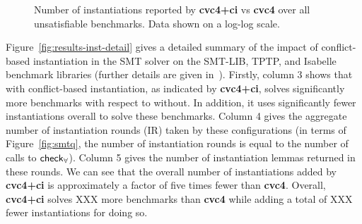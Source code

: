 \documentclass[oribibl]{llncs}
\begin{document}
\begin{figure}[t]
\caption{ Number of instantiations reported by
{\bf cvc4+ci} vs {\bf cvc4} over all unsatisfiable benchmarks.
Data shown on a log-log scale.
}
\label{fig:cbqi-scatter}
\end{figure}

Figure~\ref{fig:results-inst-detail}
gives a detailed summary of the impact of conflict-based instantiation in the SMT solver \cvc
on the SMT-LIB, TPTP, and Isabelle benchmark libraries (further details are given in~\cite{}).
Firstly, column 3 shows that \cvc with conflict-based instantiation, as indicated by {\bf cvc4+ci},
solves significantly more benchmarks with respect to \cvc without.
In addition, it uses significantly fewer instantiations overall to solve these benchmarks.
Column 4 gives the aggregate number of instantiation rounds (IR) taken by these configurations
(in terms of Figure~\ref{fig:smtq}, the number of instantiation rounds is equal to the number of calls to $\small\mathsf{check}_\forall$).
Column 5 gives the number of instantiation lemmas returned in these rounds.
We can see that the overall number of instantiations added by {\bf cvc4+ci} is approximately
a factor of five times fewer than {\bf cvc4}.
Overall, {\bf cvc4+ci} solves XXX more benchmarks than {\bf cvc4}
while adding a total of XXX fewer instantiations for doing so.
\end{document}
